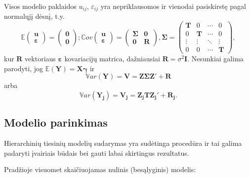 \documentclass[11pt,a4paper]{article}
\begin{document}
Visos modelio paklaidos $u_{ij}$, $\varepsilon_{ij}$ yra nepriklausomos ir vienodai pasiskirstę pagal normalųjį dėsnį, t.y.
\[\mathbb{E}\begin{pmatrix}
\mathbf{u} \\
\boldsymbol{\varepsilon}
\end{pmatrix}=
\begin{pmatrix}
\mathbf{0} \\
\mathbf{0}
\end{pmatrix};
\mathbb{C}ov\begin{pmatrix}
\mathbf{u} \\
\boldsymbol{\varepsilon}
\end{pmatrix}=
\begin{pmatrix}
\mathbf{\Sigma}&\mathbf{0} \\
\mathbf{0}&\mathbf{R}
\end{pmatrix},
\mathbf{\Sigma}=
\begin{pmatrix}
\mathbf{T} & 0 & \cdots & 0 \\
0 & \mathbf{T} & \cdots & 0\\
\vdots & \vdots & \ddots & \vdots \\
0&0 & \cdots & \mathbf{T}
\end{pmatrix},
\]
kur $\mathbf{R}$ vektoriaus $\boldsymbol{\varepsilon}$ kovariacijų matrica, dažniausiai $\mathbf{R}=\sigma^2\mathbf{I}$. Nesunkiai galima parodyti, jog $\mathbb{E}(\mathbf{Y})=\mathbf{X}\boldsymbol{\gamma}$ ir
\begin{equation} \label{eq:var}
\mathbb{V}ar(\mathbf{Y})=\mathbf{V}=\mathbf{Z\Sigma Z}'+\mathbf{R}
\end{equation}
arba
\begin{equation} \label{eq:varj}
\mathbb{V}ar(\mathbf{Y_j})=\mathbf{V_j}=\mathbf{Z_jTZ_j}'+\mathbf{R_j}.
\end{equation}


\subsection{Modelio parinkimas} \label{subsec:parink}
\indent Hierarchinių tiesinių modelių sudarymas yra sudėtinga procedūra ir tai galima padaryti įvairiais būdais bei gauti labai skirtingus rezultatus.

\indent Pradžioje visuomet skaičiuojamas nulinis (besąlyginis) modelis:
\end{document}
